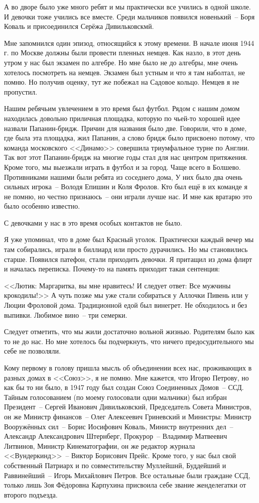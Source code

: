 А во дворе было уже много ребят и мы практически все учились в одной школе. И девочки тоже учились все вместе. Среди мальчиков появился новенький~-- Боря Коваль и присоединился Серёжа Дивильковскмй.

Мне запомнился один эпизод, относящийся к этому времени. В начале июня 1944 г. по Москве должны были провести пленных немцев. Как назло, в этот день утром у нас был экзамен по алгебре. Но мне было не до алгебры, мне очень хотелось посмотреть на немцев. Экзамен был устным и что я там наболтал, не помню. Но получив оценку, тут же побежал на Садовое кольцо. Немцев я не пропустил.

Нашим ребячьим увлечением в это время был футбол. Рядом с нашим домом находилась довольно приличная площадка, которую по чьей-то хорошей идее назвали Папанин-бридж. Причин для названия было две. Говорили, что в доме, где была эта площадка, жил Папанин, а слово бридж было присвоено потому, что команда московского <<Динамо>> совершила триумфальное турне по Англии. Так вот этот Папанин-бридж на многие годы стал для нас центром притяжения. Кроме того, мы выезжали играть в футбол и за город. Чаще всего в Болшево. Противниками нашими были ребята из соседнего дома, У них было два очень сильных игрока~-- Володя Епишин и Коля Фролов. Кто был ещё в их команде я не помню, но честно признаюсь~-- они играли лучше нас. И мне как вратарю это было особенно известно.

С девочками у нас в это время особых контактов не было.

Я уже упоминал, что в доме был Красный уголок. Практически каждый вечер мы там собирались, играли в биллиард или просто дурачились. Но мы становились старше. Появился патефон, стали приходить девочки. Я притащил из дома флирт и началась переписка. Почему-то на память приходит такая сентенция:

<<Лютик: Маргаритка, вы мне нравитесь! И следует ответ: Все мужчины крокодилы!>> А чуть позже мы уже стали собираться у Аллочки Пивень или у Люции Фроловой дома. Традиционной едой был винегрет. Не обходилось и без выпивки. Любимое вино~-- три семерки.

Следует отметить, что мы жили достаточно вольной жизнью. Родителям было как то не до нас. Но мне хотелось бы подчеркнуть, что ничего предосудительного мы
себе не позволяли.

Кому первому в голову пришла мысль об объединении всех нас, проживающих в разных домах в <<Союз>>, я не помню. Мне кажется, что Игорю Петрову, но как бы то ни было, в 1947 году был создан Союз Соединенных Домов~-- ССД. Тайным голосованием (по моему голосовали одни мальчики) был избран Президент~-- Сергей Иванович Дивильковский, Председатель Совета Министров, он же Министр финансов~-- Олег Алексеевич Гриневский и Министры: Министр Вооружённых сил~-- Борис Иосифович Коваль, Министр внутренних дел~-- Александр Александрович Штернберг, Прокурор~-- Владимир Матвеевич Литвинов, Министр Кинематографии, он же редактор журнала <<Вундеркинд>>~-- Виктор Борисович Прейс. Кроме того, у нас был свой собственный Патриарх и по совместительству Муллейшнй, Буддейший и Раввинейший~-- Игорь Михайлович Петров. Все остальные были граждане ССД, только лишь Зоя Фёдоровна Карпухина присвоила себе звание женделегатки от второго подъезда.


